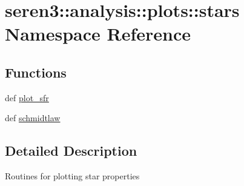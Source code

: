 \hypertarget{namespaceseren3_1_1analysis_1_1plots_1_1stars}{
\section{seren3::analysis::plots::stars Namespace Reference}
\label{namespaceseren3_1_1analysis_1_1plots_1_1stars}
}
\subsection*{Functions}
\begin{DoxyCompactItemize}
\item 
def \hyperlink{namespaceseren3_1_1analysis_1_1plots_1_1stars_a58d424bd1e6b0f4702eb71aa96a284b4}{plot\_\-sfr}
\item 
def \hyperlink{namespaceseren3_1_1analysis_1_1plots_1_1stars_a0a46bbde959b6176761e2501d638eb9f}{schmidtlaw}
\end{DoxyCompactItemize}


\subsection{Detailed Description}
\begin{DoxyVerb}
Routines for plotting star properties
\end{DoxyVerb}
 

